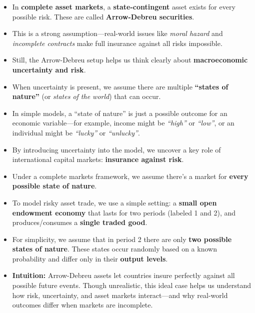 \documentclass[12pt]{article}
\begin{document}
\begin{itemize}
\item In \textbf{complete asset markets}, a \textbf{state-contingent} asset exists for every possible risk. These are called \textbf{Arrow-Debreu securities}.

\item This is a strong assumption—real-world issues like \textit{moral hazard} and \textit{incomplete contracts} make full insurance against all risks impossible.

\item Still, the Arrow-Debreu setup helps us think clearly about \textbf{macroeconomic uncertainty and risk}.

\item When uncertainty is present, we assume there are multiple \textbf{“states of nature”} (or \textit{states of the world}) that can occur.

\item In simple models, a “state of nature” is just a possible outcome for an economic variable—for example, income might be \textit{“high”} or \textit{“low”}, or an individual might be \textit{“lucky”} or \textit{“unlucky”}.

\item By introducing uncertainty into the model, we uncover a key role of international capital markets: \textbf{insurance against risk}.

\item Under a complete markets framework, we assume there’s a market for \textbf{every possible state of nature}.

\item To model risky asset trade, we use a simple setting: a \textbf{small open endowment economy} that lasts for two periods (labeled 1 and 2), and produces/consumes a \textbf{single traded good}.

\item For simplicity, we assume that in period 2 there are only \textbf{two possible states of nature}. These states occur randomly based on a known probability and differ only in their \textbf{output levels}.

\item \textbf{Intuition:} Arrow-Debreu assets let countries insure perfectly against all possible future events. Though unrealistic, this ideal case helps us understand how risk, uncertainty, and asset markets interact—and why real-world outcomes differ when markets are incomplete.
\end{itemize}
\end{document}
